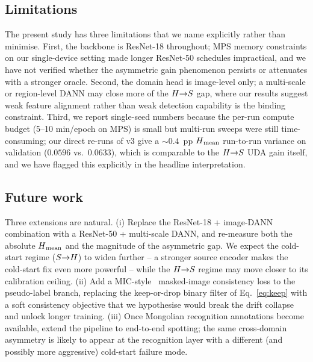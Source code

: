 \subsection{Limitations}
The present study has three limitations that we name explicitly
rather than minimise. First, the backbone is ResNet-18 throughout;
MPS memory constraints on our single-device setting made longer
ResNet-50 schedules impractical, and we have not verified whether the
asymmetric gain phenomenon persists or attenuates with a stronger
oracle. Second, the domain head is image-level only; a multi-scale or
region-level DANN may close more of the $H{\rightarrow}S$ gap, where our
results suggest weak feature alignment rather than weak detection
capability is the binding constraint. Third, we report single-seed
numbers because the per-run compute budget (5--10 min/epoch on MPS) is
small but multi-run sweeps were still time-consuming; our direct
re-runs of v3 give a $\sim$$0.4$~pp $H\textsubscript{mean}$ run-to-run variance on
validation ($0.0596$ vs.\ $0.0633$), which is comparable to the
$H{\rightarrow}S$ UDA gain itself, and we have flagged this explicitly in
the headline interpretation.

\subsection{Future work}
Three extensions are natural. (i) Replace the ResNet-18 + image-DANN
combination with a ResNet-50 + multi-scale DANN, and re-measure both
the absolute $H\textsubscript{mean}$ and the magnitude of the asymmetric gap. We
expect the cold-start regime ($S{\rightarrow}H$) to widen further -- a stronger
source encoder makes the cold-start fix even more powerful -- while
the $H{\rightarrow}S$ regime may move closer to its calibration ceiling.
(ii) Add a MIC-style~\cite{hoyer2023mic} masked-image consistency loss
to the pseudo-label branch, replacing the keep-or-drop binary filter
of Eq.~\ref{eq:keep} with a soft consistency objective that we
hypothesise would break the drift collapse and unlock longer training.
(iii) Once Mongolian recognition annotations become available,
extend the pipeline to end-to-end spotting; the same cross-domain
asymmetry is likely to appear at the recognition layer with a
different (and possibly more aggressive) cold-start failure mode.
